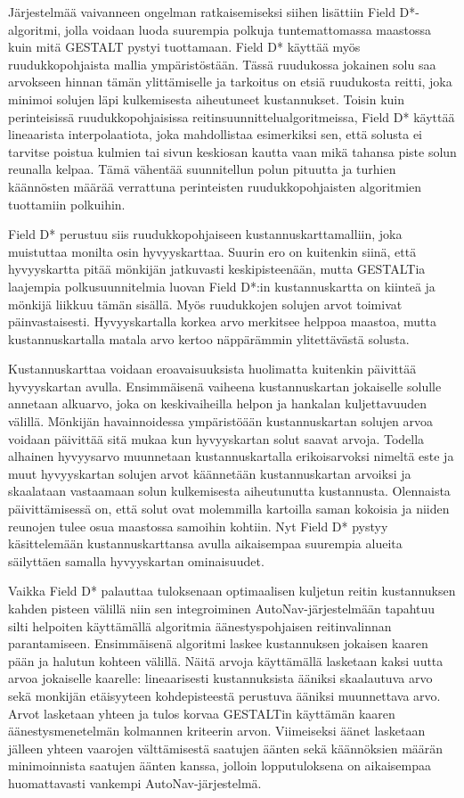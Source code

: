 \documentclass[finnish]{tktltiki2}
\theoremstyle{definition}
\theoremstyle{remark}
\begin{document}
Järjestelmää vaivanneen ongelman ratkaisemiseksi siihen lisättiin Field D*-algoritmi, jolla voidaan luoda suurempia polkuja tuntemattomassa maastossa kuin mitä GESTALT pystyi tuottamaan. Field D* käyttää myös ruudukkopohjaista mallia ympäristöstään. Tässä ruudukossa jokainen solu saa arvokseen hinnan tämän ylittämiselle ja tarkoitus on etsiä ruudukosta reitti, joka minimoi solujen läpi kulkemisesta aiheutuneet kustannukset. Toisin kuin perinteisissä ruudukkopohjaisissa reitinsuunnittelualgoritmeissa, Field D* käyttää lineaarista interpolaatiota, joka mahdollistaa esimerkiksi sen, että solusta ei tarvitse poistua kulmien tai sivun keskiosan kautta vaan mikä tahansa piste solun reunalla kelpaa. Tämä vähentää suunnitellun polun pituutta ja turhien käännösten määrää verrattuna perinteisten ruudukkopohjaisten algoritmien tuottamiin polkuihin.

Field D* perustuu siis ruudukkopohjaiseen kustannuskarttamalliin, joka muistuttaa monilta osin hyvyyskarttaa. Suurin ero on kuitenkin siinä, että hyvyyskartta pitää mönkijän jatkuvasti keskipisteenään, mutta GESTALTia laajempia polkusuunnitelmia luovan Field D*:in kustannuskartta on kiinteä ja mönkijä liikkuu tämän sisällä. Myös ruudukkojen solujen arvot toimivat päinvastaisesti. Hyvyyskartalla korkea arvo merkitsee helppoa maastoa, mutta kustannuskartalla matala arvo kertoo näppärämmin ylitettävästä solusta.

Kustannuskarttaa voidaan eroavaisuuksista huolimatta kuitenkin päivittää hyvyyskartan avulla. Ensimmäisenä vaiheena kustannuskartan jokaiselle solulle annetaan alkuarvo, joka on keskivaiheilla helpon ja hankalan kuljettavuuden välillä. Mönkijän havainnoidessa ympäristöään kustannuskartan solujen arvoa voidaan päivittää sitä mukaa kun hyvyyskartan solut saavat arvoja. Todella alhainen hyvyysarvo muunnetaan kustannuskartalla erikoisarvoksi nimeltä este ja muut hyvyyskartan solujen arvot käännetään kustannuskartan arvoiksi ja skaalataan vastaamaan solun kulkemisesta aiheutunutta kustannusta. Olennaista päivittämisessä on, että solut ovat molemmilla kartoilla saman kokoisia ja niiden reunojen tulee osua maastossa samoihin kohtiin. Nyt Field D* pystyy käsittelemään kustannuskarttansa avulla aikaisempaa suurempia alueita säilyttäen samalla hyvyyskartan ominaisuudet.

Vaikka Field D* palauttaa tuloksenaan optimaalisen kuljetun reitin kustannuksen kahden pisteen välillä niin sen integroiminen AutoNav-järjestelmään tapahtuu silti helpoiten käyttämällä algoritmia äänestyspohjaisen reitinvalinnan parantamiseen. Ensimmäisenä algoritmi laskee kustannuksen jokaisen kaaren pään ja halutun kohteen välillä. Näitä arvoja käyttämällä lasketaan kaksi uutta arvoa jokaiselle kaarelle: lineaarisesti kustannuksista ääniksi skaalautuva arvo sekä monkijän etäisyyteen kohdepisteestä perustuva ääniksi muunnettava arvo. Arvot lasketaan yhteen ja tulos korvaa GESTALTin käyttämän kaaren äänestysmenetelmän kolmannen kriteerin arvon. Viimeiseksi äänet lasketaan jälleen yhteen vaarojen välttämisestä saatujen äänten sekä käännöksien määrän minimoinnista saatujen äänten kanssa, jolloin lopputuloksena on aikaisempaa huomattavasti vankempi AutoNav-järjestelmä.
\end{document}
